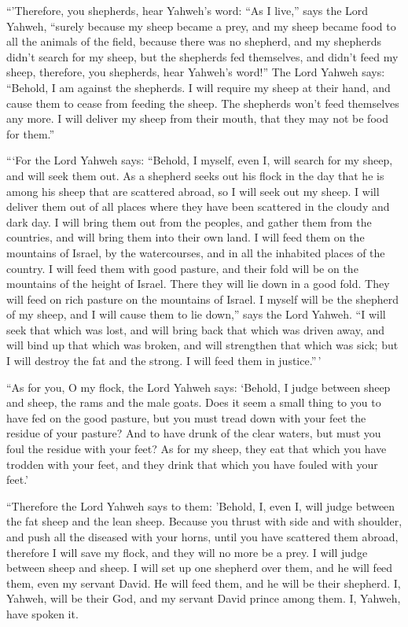 ``'Therefore, you shepherds, hear Yahweh's word:
 ``As I live,'' says the Lord Yahweh, ``surely because my
sheep became a prey, and my sheep became food to all the animals of the
field, because there was no shepherd, and my shepherds didn't search for
my sheep, but the shepherds fed themselves, and didn't feed my sheep,
 therefore, you shepherds, hear Yahweh's word!''
 The Lord Yahweh says: ``Behold, I am against the
shepherds. I will require my sheep at their hand, and cause them to
cease from feeding the sheep. The shepherds won't feed themselves any
more. I will deliver my sheep from their mouth, that they may not be
food for them.''

 ```For the Lord Yahweh says: ``Behold, I myself, even I,
will search for my sheep, and will seek them out.  As a
shepherd seeks out his flock in the day that he is among his sheep that
are scattered abroad, so I will seek out my sheep. I will deliver them
out of all places where they have been scattered in the cloudy and dark
day.  I will bring them out from the peoples, and gather
them from the countries, and will bring them into their own land. I will
feed them on the mountains of Israel, by the watercourses, and in all
the inhabited places of the country.  I will feed them
with good pasture, and their fold will be on the mountains of the height
of Israel. There they will lie down in a good fold. They will feed on
rich pasture on the mountains of Israel.  I myself will
be the shepherd of my sheep, and I will cause them to lie down,'' says
the Lord Yahweh.  ``I will seek that which was lost, and
will bring back that which was driven away, and will bind up that which
was broken, and will strengthen that which was sick; but I will destroy
the fat and the strong. I will feed them in justice.''\,'

 ``As for you, O my flock, the Lord Yahweh says: `Behold,
I judge between sheep and sheep, the rams and the male goats.
 Does it seem a small thing to you to have fed on the
good pasture, but you must tread down with your feet the residue of your
pasture? And to have drunk of the clear waters, but must you foul the
residue with your feet?  As for my sheep, they eat that
which you have trodden with your feet, and they drink that which you
have fouled with your feet.'

 ``Therefore the Lord Yahweh says to them: 'Behold, I,
even I, will judge between the fat sheep and the lean sheep.
 Because you thrust with side and with shoulder, and push
all the diseased with your horns, until you have scattered them abroad,
 therefore I will save my flock, and they will no more be
a prey. I will judge between sheep and sheep.  I will set
up one shepherd over them, and he will feed them, even my servant David.
He will feed them, and he will be their shepherd.  I,
Yahweh, will be their God, and my servant David prince among them. I,
Yahweh, have spoken it.

